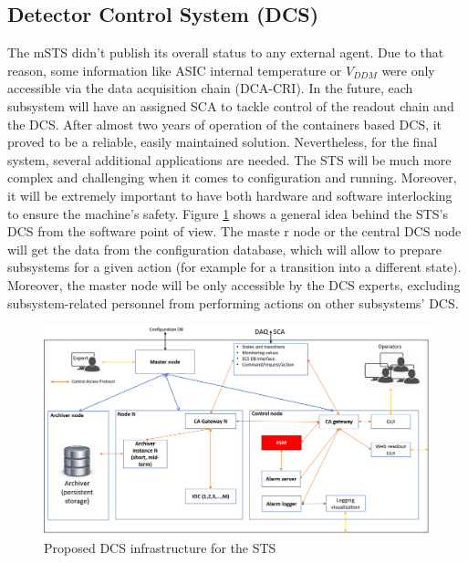 \subsection{Detector Control System (DCS)}
The mSTS didn't publish its overall status to any external agent. Due to that reason, some information like \gls{ASIC} internal temperature or $V_{DDM}$ were only accessible via the data acquisition chain (\gls{DCA}-\gls{CRI}). In the future, each subsystem will have an assigned \gls{SCA} to tackle control of the readout chain and the DCS. After almost two years of operation of the containers based \gls{DCS}, it proved to be a reliable, easily maintained solution. Nevertheless, for the final system, several additional applications are needed. The STS will be much more complex and challenging when it comes to configuration and running. Moreover, it will be extremely important to have both hardware and software interlocking to ensure the machine's safety.
Figure \ref{fig_arch} shows a general idea behind the STS's DCS from the software point of view. The maste r node or the central DCS node will get the data from the configuration database, which will allow to prepare subsystems for a given action (for example for a transition into a different state). Moreover, the master node will be only accessible by the DCS experts, excluding subsystem-related personnel from performing actions on other subsystems' DCS. 

\begin{figure}[!h]
\centering
\includegraphics[width=0.85\columnwidth]{Chapter3/DCS/images/DCS.png}
\caption{Proposed DCS infrastructure for the STS}
\label{fig_arch}
\end{figure}
